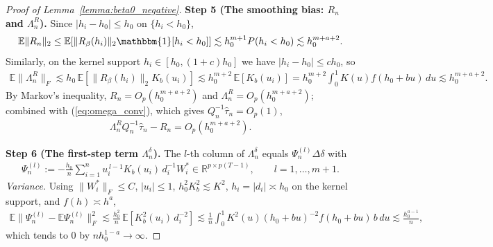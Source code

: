 \documentclass{article}
\newcommand{\normm}[1]{\lVert#1\rVert}
\newcommand{\E}{\mathbb{E}}
\newcommand{\R}{\mathbb{R}}
\newcommand{\I}{\mathbbm{1}}
\begin{document}
\begin{appendices}
\begin{proof}[Proof of Lemma~\ref{lemma:beta0_negative}]
\textbf{Step 5 (The smoothing bias: $R_n$ and $\Lambda_n^R$).}
Since $|h_i-h_0|\le h_0$ on $\{h_i<h_0\}$,
\begin{align*}
    \E\normm{R_n}_2
    \le \E\!\left[\normm{R_{\beta}(h_i)}_2\I[h_i< h_0]\right]
    \lesssim h_0^{m+1}P(h_i<h_0)\lesssim h_0^{m+a+2}.
\end{align*}
Similarly, on the kernel support $h_i\in[h_0,(1+c)h_0]$ we have
$|h_i-h_0|\le ch_0$, so
\begin{align*}
    \E\normm{\Lambda_n^R}_F
    \lesssim h_0\,\E\!\left[\normm{R_{\beta}(h_i)}_2 K_b(u_i)\right]
    \lesssim h_0^{m+2}\,\E\!\left[K_b(u_i)\right]
    = h_0^{m+2}\int_{0}^{1}K(u)f(h_0+bu)\,du
    \lesssim h_0^{m+a+2}.
\end{align*}
By Markov's inequality, $R_n=O_p(h_0^{m+a+2})$ and
$\Lambda_n^R=O_p(h_0^{m+a+2})$; combined with (\ref{eq:omega_conv}), which gives
$Q_n^{-1}\hat\tau_n=O_p(1)$,
\begin{align}\label{eq:bias_terms}
    \Lambda_n^{R}Q_n^{-1}\hat\tau_n-R_n=O_p\!\left(h_0^{m+a+2}\right).
\end{align}


\textbf{Step 6 (The first-step term $\Lambda_n^{\delta}$).}
The $l$-th column of $\Lambda_n^{\delta}$ equals $\Psi_n^{(l)}\Delta\delta$ with
\begin{align*}
    \Psi_n^{(l)} := -\frac{h_0}{n}\sum_{i=1}^n u_i^{\,l-1}K_b(u_i)\,d_i^{-1}W_i^{*}
    \in\R^{p\times p(T-1)},\qquad l=1,\dots,m+1 .
\end{align*}
\emph{Variance.} Using $\normm{W_i^{*}}_F\le C$, $|u_i|\le1$, $h_0^2K_b^2\lesssim K^2$,
$h_i=|d_i|\asymp h_0$ on the kernel support, and $f(h)\asymp h^{a}$,
\begin{align*}
    \E\normm{\Psi_n^{(l)}-\E\Psi_n^{(l)}}_F^2
    \lesssim \frac{h_0^2}{n}\,\E\!\left[K_b^2(u_i)\,d_i^{-2}\right]
    \lesssim \frac{1}{n}\int_{0}^{1}K^2(u)(h_0+bu)^{-2}f(h_0+bu)\,b\,du
    \lesssim \frac{h_0^{a-1}}{n},
\end{align*}
which tends to $0$ by $nh_0^{1-a}\to\infty$.
 

\end{proof}
\end{appendices}
\end{document}
